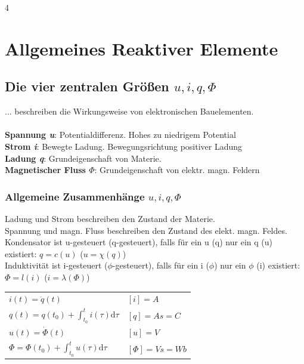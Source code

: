 \documentclass[fs, footer]{latex4ei}
\begin{document}
\begin{multicols*}{4}
    \section{Allgemeines Reaktiver Elemente}

    \subsection{Die vier zentralen Größen $u,i,q,\Phi$}
    ... beschreiben die Wirkungsweise von elektronischen Bauelementen.\\ \\
    \textbf{Spannung \textit{u}}: Potentialdifferenz. Hohes zu niedrigem Potential\\
    \textbf{Strom \textit{i}}: Bewegte Ladung. Bewegungsrichtung positiver Ladung\\
    \textbf{Ladung \textit{q}}: Grundeigenschaft von Materie.\\
    \textbf{Magnetischer Fluss \textit{$\Phi$}}: Grundeigenschaft von elektr. magn. Feldern\\
    \subsubsection{Allgemeine Zusammenhänge $u,i,q,\Phi$}
    Ladung und Strom beschreiben den Zustand der Materie.\\
    Spannung und magn. Fluss beschreiben den Zustand des elekt. magn. Feldes.\\
    Kondensator ist u-gesteuert (q-gesteuert), falls für ein u (q) nur ein q (u)  existiert: $q=c(u)$ ($u=\chi(q)$) \\
    Induktivität ist i-gesteuert ($\phi$-gesteuert), falls für ein i ($\phi$) nur ein $\phi$ (i) existiert: $\Phi=l(i)$ ($i=\lambda(\Phi)$) \\
    \begin{tabular}{l|l}
        $i(t) = \dot q(t)$                                      & $[i]=A$        \\
        $q(t) = q(t_0) + \int_{t_0}^t i(\tau) \mathrm d\tau$    & $[q]=As=C$     \\ \hline
        $u(t) = \dot \Phi(t)$                                   & $[u]=V$        \\
        $\Phi = \Phi(t_0) + \int_{t_0}^t u(\tau) \mathrm d\tau$ & $[\Phi]=Vs=Wb$ \\
    \end{tabular}


\end{multicols*}
\end{document}
